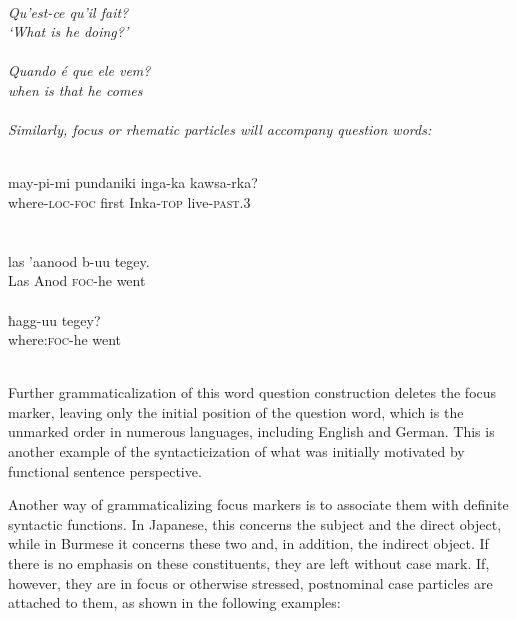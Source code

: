\ea\label{ex:E97}
\langinfo{\LangFren}{}{}\\
 \itshape Qu'est-ce qu'il fait?\\
 \glt ‘What is he doing?’\\
\z
\noindent \ea\label{ex:E98}
\langinfo{\LangPort}{}{}\\
\gll    Quando  é  que  ele  vem?\\
 when  is  that  he  comes\\
\\
\z
\noindent Similarly, focus or rhematic particles will accompany question words:

\ea\label{ex:E99}
\\
\gll may-pi-mi  pundaniki  inga-ka  kawsa-rka?\\
 where-\textsc{loc}-\textsc{foc}  first  Inka-\textsc{top}  live-\textsc{past}.3\\
\\
\z
\noindent \ea\label{ex:E100}
\\
 \ea
 \gll las  'aanood  b-uu  tegey.\\
   Las  Anod  \textsc{foc}-he  went\\
\\
\ex
\gll  ħagg-uu  tegey?\\
  where:\textsc{foc}-he  went\\
\\
\z
\z
{}

\noindent Further grammaticalization of this word question construction deletes the focus marker, leaving only the initial position of the question word, which is the unmarked order in numerous languages, including English and German. This is another example of the syntacticization of what was initially motivated by functional sentence perspective.

Another way of grammaticalizing focus markers is to associate them with definite syntactic functions. In Japanese, this concerns the subject and the direct object, while in Burmese it concerns these two and, in addition, the indirect object. If there is no emphasis on these constituents, they are left without case mark. If, however, they are in focus or otherwise stressed, postnominal case particles are attached to them, as shown in the following examples:

